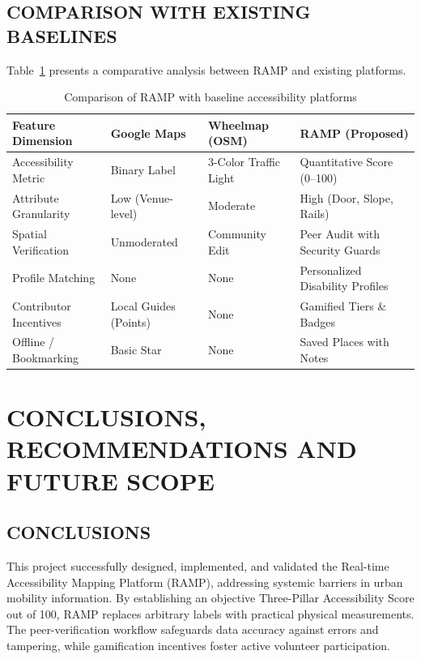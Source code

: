 \documentclass[12pt,a4paper]{report}
\begin{document}
\clearpage
\section{COMPARISON WITH EXISTING BASELINES}
Table~\ref{tab:platform_comparison} presents a comparative analysis between RAMP and existing platforms.

\begin{table}[htbp]
\centering
\caption{Comparison of RAMP with baseline accessibility platforms}
\label{tab:platform_comparison}
\begin{tabularx}{\textwidth}{lXXX}
\toprule
\textbf{Feature Dimension} & \textbf{Google Maps} & \textbf{Wheelmap (OSM)} & \textbf{RAMP (Proposed)} \\
\midrule
Accessibility Metric & Binary Label & 3-Color Traffic Light & Quantitative Score (0--100) \\
Attribute Granularity & Low (Venue-level) & Moderate & High (Door, Slope, Rails) \\
Spatial Verification & Unmoderated & Community Edit & Peer Audit with Security Guards \\
Profile Matching & None & None & Personalized Disability Profiles \\
Contributor Incentives & Local Guides (Points) & None & Gamified Tiers \& Badges \\
Offline / Bookmarking & Basic Star & None & Saved Places with Notes \\
\bottomrule
\end{tabularx}
\end{table}

\newpage
\chapter{CONCLUSIONS, RECOMMENDATIONS AND FUTURE SCOPE}

\section{CONCLUSIONS}
This project successfully designed, implemented, and validated the Real-time Accessibility Mapping Platform (RAMP), addressing systemic barriers in urban mobility information. By establishing an objective Three-Pillar Accessibility Score out of 100, RAMP replaces arbitrary labels with practical physical measurements. The peer-verification workflow safeguards data accuracy against errors and tampering, while gamification incentives foster active volunteer participation.
\end{document}
